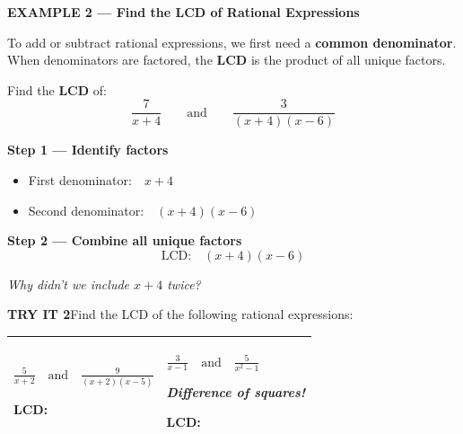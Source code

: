 \documentclass[11pt]{article}
\newcommand{\examplehead}[1]{%
  \bigskip\noindent%
  \begin{tcolorbox}[colback=examplebg,colframe=examplebg,boxrule=0pt,
                    left=5pt,right=5pt,top=3pt,bottom=3pt,arc=1pt]%
    \large\bfseries #1%
  \end{tcolorbox}\smallskip}
\newcommand{\sidequestion}[1]{%
  \smallskip\noindent\textit{\small #1}\par}
\begin{document}
\examplehead{EXAMPLE 2 --- Find the LCD of Rational Expressions}

To add or subtract rational expressions, we first need a
\textbf{common denominator}. When denominators are factored, the \textbf{LCD}
is the product of all unique factors.

Find the \textbf{LCD} of:
\[ \frac{7}{x+4} \qquad \text{and} \qquad \frac{3}{(x+4)(x-6)} \]

\textbf{Step 1 --- Identify factors}
\begin{itemize}
  \item First denominator:\ \ $x+4$
  \item Second denominator:\ \ $(x+4)(x-6)$
\end{itemize}

\textbf{Step 2 --- Combine all unique factors}
\[ \text{LCD:}\quad (x+4)(x-6) \]

\sidequestion{Why didn't we include $x+4$ twice?}
\vspace{1.4cm}

\textbf{TRY IT 2}\quad Find the LCD of the following rational expressions:

\renewcommand{\arraystretch}{1.3}
\begin{tabularx}{\textwidth}{|>{\raggedright\arraybackslash}X|>{\raggedright\arraybackslash}X|}
\hline
\begin{minipage}[t][4.5cm][t]{\linewidth}
\centering\vspace{0.15cm}
$\displaystyle \frac{5}{x+2} \quad \text{and} \quad \frac{9}{(x+2)(x-5)}$

\vspace{2.5cm}
\raggedright\textbf{LCD:}
\end{minipage}
&
\begin{minipage}[t][4.5cm][t]{\linewidth}
\centering\vspace{0.15cm}
$\displaystyle \frac{3}{x-1} \quad \text{and} \quad \frac{5}{x^{2}-1}$

\textit{Difference of squares!}

\vspace{1.9cm}
\raggedright\textbf{LCD:}
\end{minipage}
\\ \hline
\end{tabularx}
\renewcommand{\arraystretch}{1.0}
\end{document}

